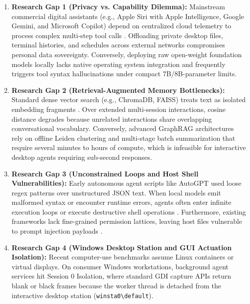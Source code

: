 \documentclass[conference,a4paper]{IEEEtran}
\begin{document}
\begin{enumerate}
    \item \textbf{Research Gap 1 (Privacy vs. Capability Dilemma):} Mainstream commercial digital assistants (e.g., Apple Siri with Apple Intelligence, Google Gemini, and Microsoft Copilot) depend on centralized cloud telemetry to process complex multi-step tool calls \cite{apple2024pcc, google2024geminiprivacy, microsoft2024copilotprivacy}. Offloading private desktop files, terminal histories, and schedules across external networks compromises personal data sovereignty. Conversely, deploying raw open-weight foundation models locally lacks native operating system integration and frequently triggers tool syntax hallucinations under compact 7B/8B-parameter limits.
    \item \textbf{Research Gap 2 (Retrieval-Augmented Memory Bottlenecks):} Standard dense vector search (e.g., ChromaDB, FAISS) treats text as isolated embedding fragments \cite{lewis2020retrieval}. Over extended multi-session interactions, cosine distance degrades because unrelated interactions share overlapping conversational vocabulary. Conversely, advanced GraphRAG architectures \cite{edge2024graphrag} rely on offline Leiden clustering and multi-stage batch summarization that require several minutes to hours of compute, which is infeasible for interactive desktop agents requiring sub-second responses.
    \item \textbf{Research Gap 3 (Unconstrained Loops and Host Shell Vulnerabilities):} Early autonomous agent scripts like AutoGPT \cite{liu2023agentbench} used loose regex patterns over unstructured JSON text. When local models emit malformed syntax or encounter runtime errors, agents often enter infinite execution loops or execute destructive shell operations \cite{ruan2023identifying}. Furthermore, existing frameworks lack fine-grained permission lattices, leaving host files vulnerable to prompt injection payloads \cite{zhang2024agent}.
    \item \textbf{Research Gap 4 (Windows Desktop Station and GUI Actuation Isolation):} Recent computer-use benchmarks assume Linux containers or virtual displays. On consumer Windows workstations, background agent services hit Session 0 Isolation, where standard GDI capture APIs return blank or black frames because the worker thread is detached from the interactive desktop station (\texttt{winsta0\textbackslash default}).
\end{enumerate}
\end{document}
